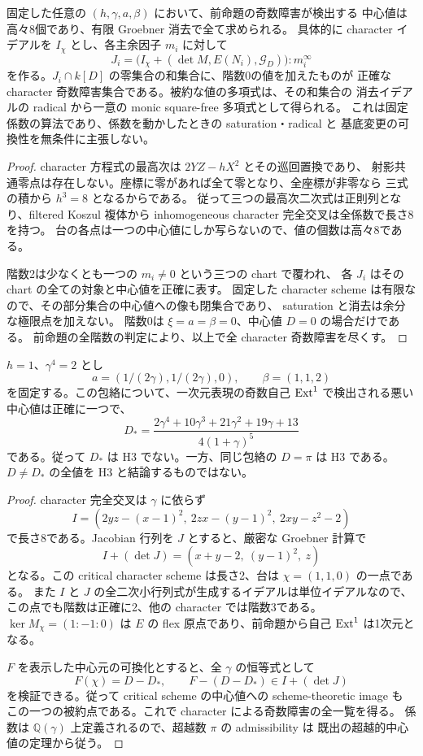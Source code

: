 \begin{corollary}[character障害の有限な完全消去算法]
\label{cor:character-obstruction-elimination}
固定した任意の $(h,\gamma,a,\beta)$ において、前命題の奇数障害が検出する
中心値は高々8個であり、有限 Groebner 消去で全て求められる。
具体的に character イデアルを $I_\chi$ とし、各主余因子 $m_i$ に対して
\[
 J_i=\bigl(I_\chi+(\det M,E(N_i),\mathcal G_D)\bigr):m_i^\infty
\]
を作る。$J_i\cap k[D]$ の零集合の和集合に、階数0の値を加えたものが
正確な character 奇数障害集合である。被約な値の多項式は、その和集合の
消去イデアルの radical から一意の monic square-free 多項式として得られる。
これは固定係数の算法であり、係数を動かしたときの saturation・radical と
基底変更の可換性を無条件に主張しない。
\end{corollary}
\begin{proof}
character 方程式の最高次は $2YZ-hX^2$ とその巡回置換であり、
射影共通零点は存在しない。座標に零があれば全て零となり、全座標が非零なら
三式の積から $h^3=8$ となるからである。
従って三つの最高次二次式は正則列となり、filtered Koszul 複体から
inhomogeneous character 完全交叉は全係数で長さ8を持つ。
台の各点は一つの中心値にしか写らないので、値の個数は高々8である。

階数2は少なくとも一つの $m_i\ne0$ という三つの chart で覆われ、
各 $J_i$ はその chart の全ての対象と中心値を正確に表す。
固定した character scheme は有限なので、その部分集合の中心値への像も閉集合であり、
saturation と消去は余分な極限点を加えない。
階数0は $\xi=a=\beta=0$、中心値 $D=0$ の場合だけである。
前命題の全階数の判定により、以上で全 character 奇数障害を尽くす。
\end{proof}

\begin{proposition}[位数4の固定包絡での一つの明示的な悪い値]
\label{prop:order4-character-bad-value}
$h=1$、$\gamma^4=2$ とし
\[
 a=(1/(2\gamma),1/(2\gamma),0),\qquad\beta=(1,1,2)
\]
を固定する。この包絡について、一次元表現の奇数自己 $\operatorname{Ext}^1$ で検出される悪い中心値は正確に一つで、
\[
 D_*=\frac{2\gamma^4+10\gamma^3+21\gamma^2+19\gamma+13}{4(1+\gamma)^5}
\]
である。従って $D_*$ は H3 でない。一方、同じ包絡の $D=\pi$ は H3 である。
$D\ne D_*$ の全値を H3 と結論するものではない。
\end{proposition}
\begin{proof}
character 完全交叉は $\gamma$ に依らず
\[
 I=(2yz-(x-1)^2,\ 2zx-(y-1)^2,\ 2xy-z^2-2)
\]
で長さ8である。Jacobian 行列を $J$ とすると、厳密な Groebner 計算で
\[
 I+(\det J)=(x+y-2,\ (y-1)^2,\ z)
\]
となる。この critical character scheme は長さ2、台は $\chi=(1,1,0)$ の一点である。
また $I$ と $J$ の全二次小行列式が生成するイデアルは単位イデアルなので、
この点でも階数は正確に2、他の character では階数3である。
$\ker M_\chi=(1:-1:0)$ は $E$ の flex 原点であり、前命題から自己 $\operatorname{Ext}^1$ は1次元となる。

$F$ を表示した中心元の可換化とすると、全 $\gamma$ の恒等式として
\[
 F(\chi)=D-D_*,\qquad F-(D-D_*)\in I+(\det J)
\]
を検証できる。従って critical scheme の中心値への scheme-theoretic image も
この一つの被約点である。これで character による奇数障害の全一覧を得る。
係数は $\mathbb Q(\gamma)$ 上定義されるので、超越数 $\pi$ の admissibility は
既出の超越的中心値の定理から従う。
\end{proof}
